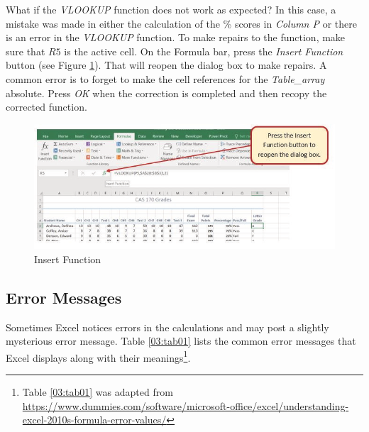 What if the \textit{VLOOKUP} function does not work as expected? In this case, a mistake was made in either the calculation of the \% scores in \textit{Column P} or there is an error in the \textit{VLOOKUP} function. To make repairs to the function, make sure that $ R5 $ is the active cell. On the Formula bar, press the \textit{Insert Function} button (see Figure \ref{03:fig15}). That will reopen the dialog box to make repairs. A common error is to forget to make the cell references for the \textit{Table\_array} absolute. Press \textit{OK} when the correction is completed and then recopy the corrected function.

\begin{figure}[H]
	\centering
	\includegraphics[width=\maxwidth{.95\linewidth}]{gfx/ch03_fig15}
	\caption{Insert Function}
	\label{03:fig15}
\end{figure}

\subsection{Error Messages}

Sometimes Excel notices errors in the calculations and may post a slightly mysterious error message. Table \ref{03:tab01} lists the common error messages that Excel displays along with their meanings\footnote{Table \ref{03:tab01} was adapted from  \url{https://www.dummies.com/software/microsoft-office/excel/understanding-excel-2010s-formula-error-values/}}.

